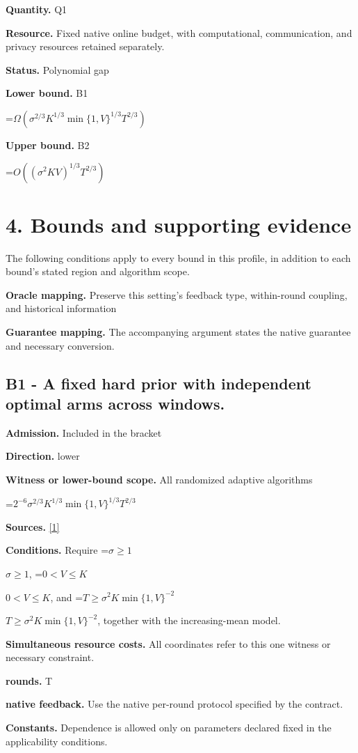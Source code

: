 \documentclass[10pt,a4paper]{article}
\newcommand{\AtlasMath}[1]{\par\begingroup\centering\setbox0=\hbox{$\displaystyle #1$}\ifdim\wd0>1.4\linewidth\typeout{ATLAS WIDE FORMULA: \the\wd0}\fi\ifdim\wd0>\linewidth\resizebox{\linewidth}{!}{\box0}\else\box0\fi\par\endgroup}
\newcommand{\AtlasInlineMath}[1]{\begingroup\setbox0=\hbox{$#1$}\ifdim\wd0>.4\linewidth\endgroup\AtlasMath{#1}\else\endgroup$#1$\fi}
\begin{document}
\textbf{Quantity.} Q1

\textbf{Resource.} Fixed native online budget, with computational, communication, and privacy resources retained separately.

\textbf{Status.} Polynomial gap

\textbf{Lower bound.} B1

\AtlasMath{\Omega(\sigma^{2/3}K^{1/3}\min\{1,V\}^{1/3}T^{2/3})}
\textbf{Upper bound.} B2

\AtlasMath{O((\sigma^2KV)^{1/3}T^{2/3})}
\section{4. Bounds and supporting evidence}
The following conditions apply to every bound in this profile, in addition to each bound's stated region and algorithm scope.

\textbf{Oracle mapping.} Preserve this setting's feedback type, within-round coupling, and historical information

\textbf{Guarantee mapping.} The accompanying argument states the native guarantee and necessary conversion.

\subsection{B1 - A fixed hard prior with independent optimal arms across windows.}
\textbf{Admission.} Included in the bracket

\textbf{Direction.} lower

\textbf{Witness or lower-bound scope.} All randomized adaptive algorithms

\AtlasMath{2^{-6}\sigma^{2/3}K^{1/3}\min\{1,V\}^{1/3}T^{2/3}}
\textbf{Sources.} \href{https://proceedings.nips.cc/paper_files/paper/2025/file/1aa670dafbd4b32ebf483f8372e612c5-Paper-Conference.pdf}{[1]}

\textbf{Conditions.} Require \AtlasInlineMath{\sigma\ge1}, \AtlasInlineMath{0<V\le K}, and \AtlasInlineMath{T\ge\sigma^2K\min\{1,V\}^{-2}}, together with the increasing-mean model.

\textbf{Simultaneous resource costs.} All coordinates refer to this one witness or necessary constraint.

\textbf{rounds.} T

\textbf{native feedback.} Use the native per-round protocol specified by the contract.

\textbf{Constants.} Dependence is allowed only on parameters declared fixed in the applicability conditions.
\end{document}
